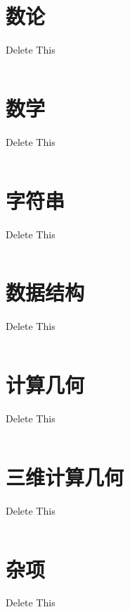 \documentclass[twoside]{article}
\begin{document}
\clearpage\section{数论}
Delete This
\begin{lstlisting}
\end{lstlisting}
\clearpage\section{数学}
Delete This
\begin{lstlisting}
\end{lstlisting}
\clearpage\section{字符串}
Delete This
\begin{lstlisting}
\end{lstlisting}
\clearpage\section{数据结构}
Delete This
\begin{lstlisting}
\end{lstlisting}
\clearpage\section{计算几何}
Delete This
\begin{lstlisting}
\end{lstlisting}
\clearpage\section{三维计算几何}
Delete This
\begin{lstlisting}
\end{lstlisting}
\clearpage\section{杂项}
Delete This
\begin{lstlisting}
\end{lstlisting}
\end{document}

